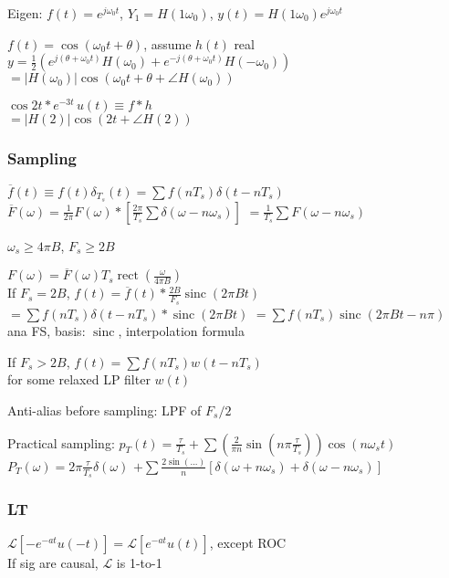 \documentclass[4pt]{article}
\theoremstyle{definition}
\theoremstyle{definition}
\renewcommand{\o}{\omega}
\DeclareMathOperator{\rect}{rect}
\DeclareMathOperator{\sinc}{sinc}
\begin{document}
\begin{multicols}{3}
    Eigen: $f(t) = e^{j\o_0t}$, \(Y_1 = H(1\o_0)\), $y(t) = H(1\o_0) e^{j\o_0 t}$

    $f(t) = \cos(\o_0 t + \theta)$, assume $h(t)$ real\\
    \(y = \frac 1 2 (e^{j(\theta + \o_0 t)}H(\o_0) + e^{-j(\theta + \o_0 t)}H(-\o_0))\)\\          %
    \(=|H(\o_0)| \cos(\o_0t + \theta + \angle H(\o_0))\)

    \(\cos 2t * e^{-3t}\, u(t) \equiv f * h\)\\       %
    \(=|H(2)| \cos(2t + \angle H(2))\)              %
\subsubsection {Sampling}
    \(\overline{f}(t)\equiv f(t) \delta_{T_s}(t) = \sum f(nT_s) \delta(t - nT_s)\)\\
    \(\overline{F}(\o) = \frac{1}{2\pi} F(\o) * [\frac{2\pi}{T_s} \sum\delta(\o - n\o_s)]\)
    \(= \frac{1}{T_s}\sum F(\o - n\o_s)\)

    $\o_s \geq 4\pi B$, $F_s \geq 2B$

    \(F(\o) = \overline{F}(\o) T_s \rect(\frac{\o}{4\pi B})\)\\   %
    If $F_s = 2B$, \(f(t) = \overline{f}(t) * \frac{2B}{F_s} \sinc(2\pi Bt)\)\\       %
    \(=\sum f(nT_s)\delta(t - nT_s) * \sinc(2\pi B t)\)
    \(= \sum f(nT_s) \sinc(2\pi Bt - n\pi)\)\\
    ana FS, basis: $\sinc$, interpolation formula

    If $F_s > 2B$, \(f(t) = \sum f(nT_s) w(t - nT_s)\)\\
    for some relaxed LP filter $w(t)$

    Anti-alias before sampling: LPF of $F_s/2$

    Practical sampling: \(p_T(t) = \frac{\tau}{T_s} + \sum(\frac{2}{\pi n}\sin(n\pi\frac{\tau}{T_s}))\cos(n\omega_s t)\)\\
    \(P_T(\o) = 2\pi \frac{\tau}{T_s}\delta(\o)\)
    \(+ \sum\frac{2\sin(...)}{n}[\delta(\o + n\o_s) + \delta(\o - n\o_s)]\)       %

\subsubsection{LT}
\(\mathcal L [-e^{-at}u(-t)] = \mathcal L [e^{-at} u(t)]\), except ROC\\
If sig are causal, $\mathcal L$ is 1-to-1           %


\end{multicols}
\end{document}
